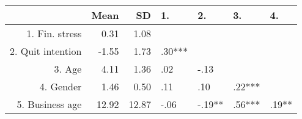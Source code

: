 \begin{table}[ht]
\centering
\begin{tabular}{rrrllll}
  \hline
 & Mean & SD & 1. & 2. & 3. & 4. \\ 
  \hline
1. Fin. stress & 0.31 & 1.08 &  &  &  &  \\ 
  2. Quit intention & -1.55 & 1.73 & .30***  &  &  &  \\ 
  3. Age & 4.11 & 1.36 & .02     & -.13     &  &  \\ 
  4. Gender & 1.46 & 0.50 & .11     & .10     & .22***  &  \\ 
  5. Business age & 12.92 & 12.87 & -.06     & -.19**   & .56***  & .19**   \\ 
   \hline
\end{tabular}
\end{table}
